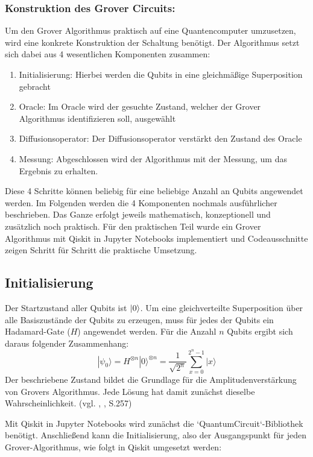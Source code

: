 \subsubsection{Konstruktion des Grover Circuits:}


Um den Grover Algorithmus praktisch auf eine Quantencomputer umzusetzen, wird eine konkrete Konstruktion der Schaltung benötigt. Der Algorithmus setzt sich dabei aus 4 wesentlichen Komponenten zusammen: 
\begin{enumerate}
    \item  Initialisierung: Hierbei werden die Qubits in eine gleichmäßige Superposition gebracht
    \item Oracle: Im Oracle wird der gesuchte Zustand, welcher der Grover Algorithmus identifizieren soll, ausgewählt
    \item Diffusionsoperator: Der Diffusionsoperator verstärkt den Zustand des Oracle
    \item   Messung: Abgeschlossen wird der Algorithmus mit der Messung, um das Ergebnis zu erhalten. 
\end{enumerate}

Diese 4 Schritte können beliebig für eine beliebige Anzahl an Qubits angewendet werden. Im Folgenden werden die 4 Komponenten nochmals ausführlicher beschrieben. Das Ganze erfolgt jeweils mathematisch, konzeptionell und zusätzlich noch praktisch. Für den praktischen Teil wurde ein Grover Algorithmus mit Qiskit in Jupyter Notebooks implementiert und Codeausschnitte zeigen Schritt für Schritt die praktische Umsetzung.

\subsection*{Initialisierung}
Der Startzustand aller Qubits ist $\ket{0}$. Um eine gleichverteilte Superposition über alle Basiszustände der Qubits zu erzeugen, muss für jedes der Qubits ein Hadamard-Gate ($H$) angewendet werden. Für die Anzahl $n$ Qubits ergibt sich daraus folgender Zusammenhang:
$$
|\psi_0\rangle = H^{\otimes n}|0\rangle^{\otimes n} = \frac{1}{\sqrt{2^n}} \sum_{x=0}^{2^n-1} |x\rangle
$$
Der beschriebene Zustand bildet die Grundlage für die Amplitudenverstärkung von Grovers Algorithmus. Jede Lösung hat damit zunächst dieselbe Wahrscheinlichkeit. (vgl. \citeauthor{nielsen_quantum_2010}, \citeyear{nielsen_quantum_2010}, S.257)

Mit Qiskit in Jupyter Notebooks wird zunächst die `QuantumCircuit`-Bibliothek benötigt. Anschließend kann die Initialisierung, also der Ausgangspunkt für jeden Grover-Algorithmus, wie folgt in Qiskit umgesetzt werden:
